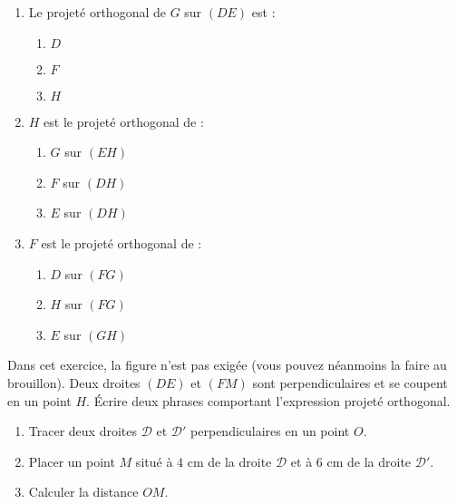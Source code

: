 \documentclass[a4paper,dvipsnames]{article}
\begin{document}
\begin{enumerate}
  \item Le projeté orthogonal de $G$ sur $(DE)$ est :
    \vspace{-2mm}
    \begin{multicols}{3}
      \begin{enumerate}
	\item $D$
	\item $F$
	\item $H$
      \end{enumerate}
    \end{multicols}
    \vspace{-2mm}
  \item $H$ est le projeté orthogonal de : 
    \vspace{-2mm}
    \begin{multicols}{3}
      \begin{enumerate}
	\item $G$ sur $(EH)$
	\item $F$ sur $(DH)$
	\item $E$ sur $(DH)$
      \end{enumerate}
    \end{multicols}
    \vspace{-2mm}
  \item $F$ est le projeté orthogonal de :
    \vspace{-2mm}
    \begin{multicols}{3}
      \begin{enumerate}
	\item $D$ sur $(FG)$
	\item $H$ sur $(FG)$
	\item $E$ sur $(GH)$
      \end{enumerate}
    \end{multicols}
\end{enumerate}

\bigskip

\exo[1 point] Dans cet exercice, la figure n'est pas exigée (vous pouvez néanmoins la faire au brouillon). Deux droites $(DE)$ et $(FM)$ sont perpendiculaires et se coupent en un point $H$. Écrire deux phrases comportant l'expression \og{}projeté orthogonal\fg{}.

\bigskip

\exo[2 points] \vspace{-2mm}
\begin{enumerate}
  \item Tracer deux droites $\mathcal{D}$ et $\mathcal{D}'$ perpendiculaires en un point $O$.
  \item Placer un point $M$ situé à $4$ cm de la droite $\mathcal{D}$ et à $6$ cm de la droite $\mathcal{D}'$.
  \item Calculer la distance $OM$.
\end{enumerate}
\end{document}
